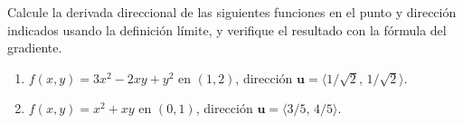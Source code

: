 Calcule la derivada direccional de las siguientes funciones en el punto y dirección indicados usando la definición límite, y verifique el resultado con la fórmula del gradiente.
\begin{enumerate}
    \item $f(x, y) = 3x^2 - 2xy + y^2$ en $(1, 2)$, dirección $\mathbf{u} = \langle 1/\sqrt{2},\, 1/\sqrt{2} \rangle$.
    \item $f(x, y) = x^2 + xy$ en $(0, 1)$, dirección $\mathbf{u} = \langle 3/5,\, 4/5 \rangle$.
\end{enumerate}
